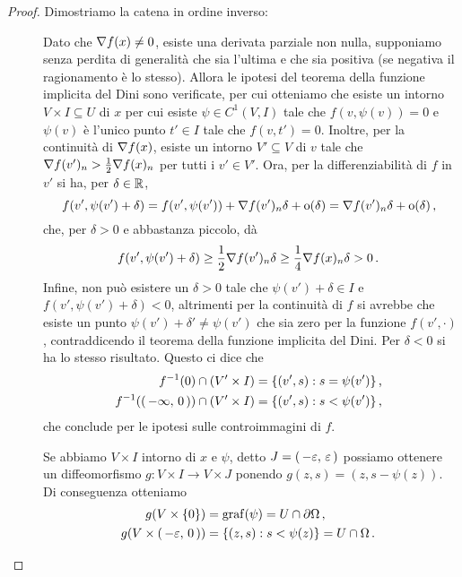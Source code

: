 \begin{proof}
	Dimostriamo la catena in ordine inverso:
	\begin{description}
		\item [] Dato che $\nabla f(x)\neq 0$, esiste una derivata parziale non nulla, supponiamo senza perdita
			di generalità che sia l'ultima e che sia positiva (se negativa il ragionamento è lo stesso).
			Allora le ipotesi del teorema della funzione implicita del Dini sono verificate, per cui otteniamo
			che esiste un intorno $V\times I\subseteq U$ di $x$ per cui esiste $\psi\in C^1(V,I)$ tale che $f(v,\psi(v))=0$ e $\psi(v)$
			è l'unico punto $t'\in I$ tale che $f(v,t')=0$.
			Inoltre, per la continuità di $\nabla f(x)$, esiste un intorno $V'\subseteq V$ di $v$ tale che $\nabla f(v')_n>\frac{1}{2}
			\nabla f(x)_n$ per tutti i $v'\in V'$. Ora, per la differenziabilità di $f$ in $v'$ si ha, per $\delta\in \mathbb R$,
			\[
				f(v',\psi(v')+\delta)=f(v', \psi(v'))+\nabla f(v')_n\delta+\mathrm{o}(\delta)=\nabla f(v')_n\delta+\mathrm{o}(\delta)\, \text{, }
			\]
			che, per $\delta>0$ e abbastanza piccolo, dà
			\begin{equation*}
				f(v',\psi(v')+\delta)\geq \frac{1}{2}\nabla f(v')_n\delta\geq \frac{1}{4}\nabla f(x)_n\delta>0\, \text{. }
			\end{equation*}
			Infine, non può esistere un $\delta>0$ tale che $\psi(v')+\delta\in I$ e
			$f(v',\psi(v')+\delta)<0$, altrimenti per la continuità di $f$ si avrebbe che esiste un punto $\psi(v')+\delta'\neq \psi(v')$
			che sia zero per la funzione $f(v',\cdot)$, contraddicendo il teorema della funzione implicita del Dini.
			Per $\delta<0$ si ha lo stesso risultato. Questo ci dice che 
			\begin{align*}
				f^{-1}(0)\cap (V'\times I)&=\{(v',s):s=\psi(v')\} \, \text{, }\\
				f^{-1}(\left(\,-\infty,\,0\,\right))\cap (V'\times I)&=\{(v',s):s<\psi(v')\}\, \text{, }
			\end{align*}
			che conclude per le ipotesi sulle controimmagini di $f$.
		\item [] Se abbiamo $V\times I$ intorno di $x$ e $\psi$, detto $J=\left(\,-\varepsilon,\,\varepsilon\,\right)$
			possiamo ottenere un diffeomorfismo $g:V\times I \rightarrow V\times J$ ponendo $g(z,s)=(z,s-\psi(z))$. 
			Di conseguenza otteniamo
			\begin{align*}
				g(V\times \{0\})&=\graf(\psi)=U\cap \partial \Omega \virgola\\
				g(V\times \oo{-\varepsilon}{0})&=\{(z,s):s<\psi(z)\}=U\cap \Omega\punto

\end{align*}
\end{description}
\end{proof}

